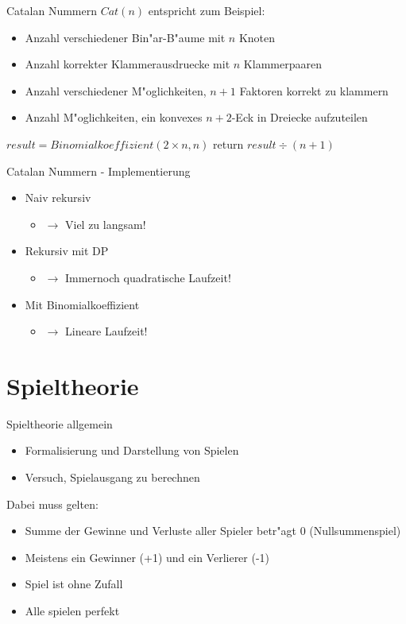 \documentclass[18pt]{beamer}
\begin{document}
\begin{frame}{Catalan Nummern}
$Cat \left( n \right)$ entspricht zum Beispiel:
\begin{itemize}
\item Anzahl verschiedener Bin"ar-B"aume mit $n$ Knoten
\item Anzahl korrekter Klammerausdruecke mit $n$ Klammerpaaren
\item Anzahl verschiedener M"oglichkeiten, $n+1$ Faktoren korrekt zu klammern
\item Anzahl M"oglichkeiten, ein konvexes $n+2$-Eck in Dreiecke aufzuteilen
\end{itemize}
\end{frame}

\begin{algorithm}
\scriptsize 
\caption{Catalan(n)}
\begin{algorithmic}
\STATE $result = Binomialkoeffizient \left( 2 \times n , n \right)$
\STATE return $result \div \left(n + 1 \right)$
\end{algorithmic}
\end{algorithm}

\begin{frame}{Catalan Nummern - Implementierung}
\begin{itemize}
\item Naiv rekursiv
\begin{itemize}
\item $\rightarrow$ Viel zu langsam! 
\end{itemize}
\item Rekursiv mit DP
\begin{itemize}
\item $\rightarrow$ Immernoch quadratische Laufzeit!
\end{itemize}
\item Mit Binomialkoeffizient
\begin{itemize}
\item $\rightarrow$ Lineare Laufzeit!
\end{itemize}
\end{itemize}
\end{frame}




\section{Spieltheorie}
\begin{frame}{Spieltheorie allgemein}
\begin{itemize}
\item Formalisierung und Darstellung von Spielen
\item Versuch, Spielausgang zu berechnen
\end{itemize}
Dabei muss gelten:
\begin{itemize}
\item Summe der Gewinne und Verluste aller Spieler betr"agt 0 (Nullsummenspiel)
\item Meistens ein Gewinner (+1) und ein Verlierer (-1)
\item Spiel ist ohne Zufall
\item Alle spielen perfekt
\end{itemize}
\end{frame}
\end{document}
